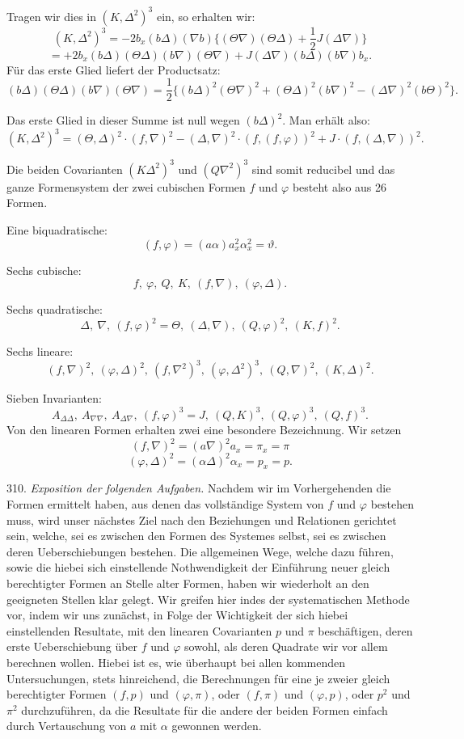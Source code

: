 Tragen wir dies in $(K, \Delta^2)^3$ ein, so erhalten wir:
\[
(K, \Delta^2)^3 = -2b_x(b\Delta)(\nabla b)\{(\Theta\nabla)(\Theta\Delta)+\frac{1}{2}J(\Delta\nabla)\}
\]
\[
= +2b_x(b\Delta)(\Theta\Delta)(b\nabla)(\Theta\nabla) + J(\Delta\nabla)(b\Delta)(b\nabla)b_x.
\]
Für das erste Glied liefert der Productsatz:
\[
(b\Delta)(\Theta\Delta)(b\nabla)(\Theta\nabla) = \frac{1}{2}\{(b\Delta)^2(\Theta\nabla)^2+(\Theta\Delta)^2(b\nabla)^2-(\Delta\nabla)^2(b\Theta)^2\}.
\]

Das erste Glied in dieser Summe ist null wegen $(b\Delta)^2$. Man erhält
also:
\[
(K, \Delta^2)^3 = (\Theta, \Delta)^2\cdot(f, \nabla)^2 - (\Delta, \nabla)^2\cdot(f, (f, \varphi))^2 + J\cdot(f, (\Delta, \nabla))^2.
\]

Die beiden Covarianten $(K\Delta^2)^3$ und $(Q\nabla^2)^3$ sind somit
reducibel und das ganze Formensystem der zwei cubischen Formen $f$ und
$\varphi$ besteht also aus 26 Formen.

Eine biquadratische:
\[
(f, \varphi) = (a\alpha)a_x^2\alpha_x^2 = \vartheta.
\]

Sechs cubische:
\[
f,\ \varphi,\ Q,\ K,\ (f, \nabla),\ (\varphi, \Delta).
\]

Sechs quadratische:
\[
\Delta,\ \nabla,\ (f, \varphi)^2 = \Theta,\ (\Delta, \nabla),\ (Q, \varphi)^2,\ (K, f)^2.
\]

Sechs lineare:
\[
(f, \nabla)^2,\ (\varphi, \Delta)^2,\ (f, \nabla^2)^3,\ (\varphi, \Delta^2)^3,\ (Q, \nabla)^2,\ (K, \Delta)^2.
\]

Sieben Invarianten:
\[
A_{\Delta\Delta},\ A_{\nabla\nabla},\ A_{\Delta\nabla},\ (f, \varphi)^3 = J,\ (Q, K)^3,\ (Q, \varphi)^3,\ (Q, f)^3.
\]
Von den linearen Formen erhalten zwei eine besondere Bezeichnung.
Wir setzen
\[
(f, \nabla)^2 = (a\nabla)^2a_x = \pi_x = \pi
\]
\[
(\varphi, \Delta)^2 = (\alpha\Delta)^2\alpha_x = p_x = p.
\]



310. \textit{Exposition der folgenden Aufgaben.} Nachdem wir im
Vorhergehenden die Formen ermittelt haben, aus denen das vollständige
System von $f$ und $\varphi$ bestehen muss, wird unser nächstes Ziel nach
den Beziehungen und Relationen gerichtet sein, welche, sei es zwischen
den Formen des Systemes selbst, sei es zwischen deren Ueberschiebungen
bestehen. Die allgemeinen Wege, welche dazu führen, sowie die hiebei
sich einstellende Nothwendigkeit der Einführung neuer gleich
berechtigter Formen an Stelle alter Formen, haben wir wiederholt an
den geeigneten Stellen klar gelegt. Wir greifen hier indes der
systematischen Methode vor, indem wir uns zunächst, in Folge der
Wichtigkeit der sich hiebei einstellenden Resultate, mit den linearen
Covarianten $p$ und $\pi$ beschäftigen, deren erste Ueberschiebung über
$f$ und $\varphi$ sowohl, als deren Quadrate wir vor allem berechnen
wollen. Hiebei ist es, wie überhaupt bei allen kommenden
Untersuchungen, stets hinreichend, die Berechnungen für eine je zweier
gleich berechtigter Formen $(f, p)$ und $(\varphi, \pi)$, oder $(f, \pi)$
und $(\varphi, p)$, oder $p^2$ und $\pi^2$ durchzuführen, da die
Resultate für die andere der beiden Formen einfach durch Vertauschung
von $a$ mit $\alpha$ gewonnen werden.

